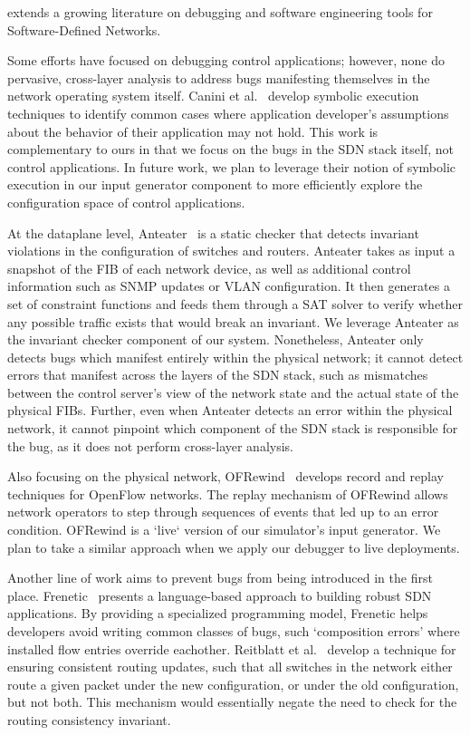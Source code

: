 \projectname{} extends a growing literature on debugging and software engineering tools for Software-Defined Networks.
    
Some efforts have focused on debugging control applications; however, none do pervasive,
cross-layer analysis to address bugs manifesting themselves in the network operating system itself. 
Canini et al.~\cite{canini} develop symbolic execution techniques to identify
common cases where application developer's assumptions about the behavior of
their application may not hold. This work is complementary to ours in
that we focus on the bugs in the SDN stack itself, not control applications.
In future work, we plan to leverage their notion of symbolic execution in our
input generator component to more efficiently explore the configuration space
of control applications.

At the dataplane level, Anteater~\cite{anteater} is a static checker that
detects invariant violations in the configuration of switches and routers.
Anteater takes as input a snapshot of the FIB of each network device, as well as
additional control information such as SNMP updates or VLAN configuration. It then
generates a set of constraint functions and feeds them through a SAT solver to verify whether
any possible traffic exists that would break an invariant. We leverage
Anteater as the invariant checker component of our system.
Nonetheless, Anteater only detects bugs which manifest entirely within the physical network;  
it cannot detect errors that manifest across the layers of the SDN stack, such as mismatches
between the control server's view of the network state and the actual state of the
physical FIBs. Further, even when Anteater detects an error within the physical network, it cannot pinpoint
which component of the SDN stack is responsible for the bug, as it does not perform cross-layer
analysis. 

Also focusing on the physical network, OFRewind~\cite{ofrewind} develops record and replay techniques
for OpenFlow networks. The replay
mechanism of OFRewind allows network operators to step through sequences of
events that led up to an error condition. OFRewind is a `live` version of our
simulator's input generator. We plan to take a similar approach when we apply
our debugger to live deployments.  

Another line of work aims to prevent bugs from being introduced in the first
place. Frenetic~\cite{frenetic} presents a language-based approach to building
robust SDN applications. By providing a specialized programming model, Frenetic helps developers avoid writing common classes of
bugs, such `composition errors' where installed flow entries override eachother.
Reitblatt et al.~\cite{consistentupdates} develop a technique for ensuring
consistent routing updates, such that all switches in the network either route
a given packet under the new configuration, or under the old configuration,
but not both. This mechanism would essentially negate the need to check for
the routing consistency invariant.

